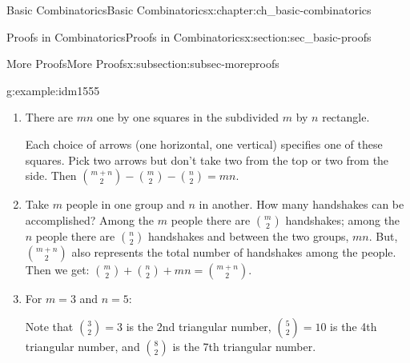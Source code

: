 \documentclass[oneside,10pt,]{book}
\numberwithin{equation}{chapter}
\begin{document}
\begin{chapterptx}{Basic Combinatorics}{}{Basic Combinatorics}{}{}{x:chapter:ch_basic-combinatorics}
\begin{sectionptx}{Proofs in Combinatorics}{}{Proofs in Combinatorics}{}{}{x:section:sec_basic-proofs}
\begin{subsectionptx}{More Proofs}{}{More Proofs}{}{}{x:subsection:subsec-moreproofs}
\begin{example}{}{g:example:idm1555}
\begin{enumerate}
\begin{sidebyside}{2}{0.025}{0.025}{0.05}
\begin{sbspanel}{0.7}[center]
\end{sbspanel}%
\end{sidebyside}%
\item{}There are \(mn\) one by one squares in the subdivided \(m\) by \(n\) rectangle.%
\begin{sidebyside}{2}{0}{0}{0.1}%
\begin{sbspanel}{0.7}%
Each choice of arrows (one horizontal, one vertical) specifies one of these squares.  Pick two arrows but don't take two from the top or two from the side.  Then \(\binom{m + n}{2} - \binom{m}{2} - \binom{n}{2} = mn\).%
\end{sbspanel}%
\begin{sbspanel}{0.2}%
%
\end{sbspanel}%
\end{sidebyside}%
\item{}Take \(m\) people in one group and \(n\) in another. How many handshakes can be accomplished? Among the \(m\) people there are \(\binom{m}{2}\) handshakes; among the \(n\) people there are \(\binom{n}{2}\) handshakes and between the two groups, \(mn\). But, \(\binom{m + n}{2}\) also represents the total number of handshakes among the people. Then we get: \(\binom{m}{2} + \binom{n}{2} + mn = \binom{m + n}{2}\).%
\item{}For \(m = 3\) and \(n = 5\):%
\begin{image}{0.35}{0.3}{0.35}%
%
\end{image}%
Note that \(\binom{3}{2} = 3\) is the 2nd triangular number, \(\binom{5}{2} = 10\) is the 4th triangular number, and \(\binom{8}{2}\) is the 7th triangular number.%
\end{enumerate}
%
\end{example}
\end{subsectionptx}
\end{sectionptx}
%
%
\typeout{************************************************}
\typeout{************************************************}

\end{chapterptx}
\end{document}
